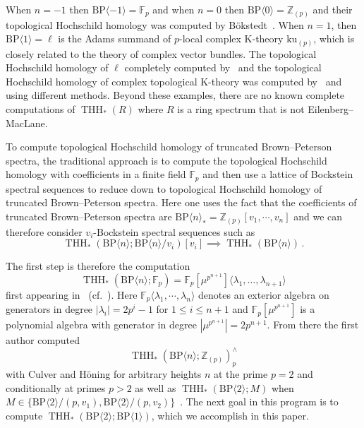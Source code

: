\documentclass[11pt]{amsart}
\newcommand{\mr}[1]{\mathrm{#1}}
\newcommand{\BP}{\mr{BP}}
\DeclareMathOperator{\THH}{THH}
\theoremstyle{definition}
\numberwithin{equation}{section}
\numberwithin{figure}{section}
\begin{document}
When $n=-1$ then $\BP\langle -1\rangle=\mathbb{F}_p$ and when $n=0$ then $\BP\langle 0\rangle=\mathbb{Z}_{(p)}$ and their topological Hochschild homology was computed by B\"okstedt~\cite{Bok85}. When $n=1$, then $\BP\langle 1\rangle=\ell$ is the Adams summand of $p$-local complex K-theory $\mathrm{ku}_{(p)}$, which is closely related to the theory of complex vector bundles. The topological Hochschild homology of $\ell$ completely computed by~\cite{AHL10} and the topological Hochschild homology of complex topological K-theory was computed by~\cite{Lee22} and \cite{Cha25} using different methods. Beyond these examples, there are no known complete computations of $\THH_*(R)$ where $R$ is a ring spectrum that is not Eilenberg--MacLane.

To compute topological Hochschild homology of truncated Brown--Peterson spectra, the traditional approach is to compute the topological Hochschild homology with coefficients in a finite field $\mathbb{F}_p$ and then use a lattice of Bockstein spectral sequences to reduce down to topological Hochschild homology of truncated Brown--Peterson spectra. Here one uses the fact that the coefficients of truncated Brown--Peterson spectra are $\BP\langle n\rangle_*=\mathbb{Z}_{(p)}[v_1,\cdots ,v_n]$ and we can therefore consider $v_i$-Bockstein spectral sequences such as 
\[ 
\THH_*(\BP\langle n\rangle;\BP\langle n\rangle/v_i)[v_i]\implies \THH_*(\BP\langle n\rangle)\,.
\]

The first step is therefore the computation 
\[ \THH_*(\BP\langle n\rangle;\mathbb{F}_p)=\mathbb{F}_p[\mu^{p^{n+1}}]\langle \lambda_1,\dots ,\lambda_{n+1} \rangle
\]
first appearing in~\cite{ACH24} (cf.~\cite{Ang26}). Here  $\mathbb{F}_p\langle \lambda_1,\cdots ,\lambda_n\rangle$ denotes an exterior algebra on generators in degree $|\lambda_{i}|=2p^i-1$ for $1\le i\le n+1$ and $\mathbb{F}_p[\mu^{p^{n+1}}]$ is a polynomial algebra with generator in degree $|\mu^{p^{n+1}}|=2p^{n+1}$. From there the first author computed 
\[ \THH_*(\BP\langle n\rangle ; \mathbb{Z}_{(p)})_p^{\wedge}\]
with Culver and H\"oning for arbitrary heights $n$ at the prime $p=2$ and conditionally at primes $p>2$ as well as 
$\THH_*(\BP\langle 2\rangle ; M)$
when $M\in \{\BP\langle 2\rangle/(p,v_1),\BP\langle 2\rangle /(p,v_2)\}$~\cite{ACH24}. The next goal in this program is to compute $\THH_*(\BP\langle 2\rangle;\BP\langle 1\rangle)$,
which we accomplish in this paper. 
\end{document}
